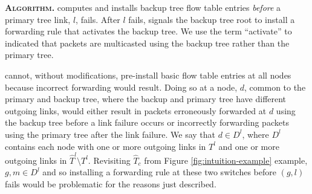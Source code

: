 

{\bf \pre \textsc{Algorithm.}}
\pre computes and installs backup tree flow table entries \emph{before} a primary tree link, $l$, fails.  After $l$ fails, \pre signals the backup tree root
to install a forwarding rule that activates the backup tree.  We use the term ``activate'' to indicated that packets are multicasted using the backup tree rather than the primary tree.


\pre cannot, without modifications, pre-install basic flow table entries at all nodes because incorrect forwarding would result. Doing so at a node, $d$, common to the primary and backup tree,
where the backup and primary tree have different outgoing links, would either result in packets erroneously forwarded at $d$ using the backup tree before a link failure occurs or 
incorrectly forwarding packets using the primary tree after the link failure. 
We say that $d \in D^l$, where $D^l$ contains each node with one or more outgoing links in $T^l$ and one or more outgoing links in $\hat{T}^l \setminus T^l$.
Revisiting $\hat{T}_c$ from Figure \ref{fig:intuition-example} example, $g,m \in D^l$ and so installing a forwarding rule at these two switches before $(g,l)$ fails 
would be problematic for the reasons just described.




